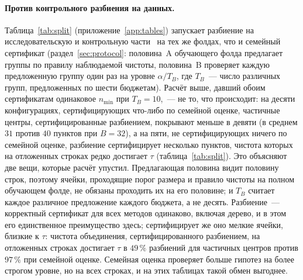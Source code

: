 \documentclass[11pt]{article}
\begin{document}
\paragraph{Против контрольного разбиения на данных.} Таблица~\ref{tab:split} (приложение~\ref{app:tables}) запускает разбиение на исследовательскую и контрольную части~\citet{webb2007} на тех же фолдах, что и семейный сертификат (раздел~\ref{sec:protocol}: половина~A обучающего фолда предлагает группы по правилу наблюдаемой чистоты, половина~B проверяет каждую предложенную группу один раз на уровне $\alpha/T_B$, где $T_B$~--- число различных групп, предложенных по шести бюджетам). Расчёт выше, давший обоим сертификатам одинаковое $n_{\min}$ при $T_B=10$,~--- не то, что происходит: на десяти конфигурациях, сертифицирующих что-либо по семейной оценке, частичные центры, сертифицированные разбиением, покрывают меньше в девяти (в среднем $31$ против $40$ пунктов при $B=32$), а на пяти, не сертифицирующих ничего по семейной оценке, разбиение сертифицирует несколько пунктов, чистота которых на отложенных строках редко достигает $\tau$ (таблица~\ref{tab:split}). Это объясняют две вещи, которые расчёт упустил. Предлагающая половина видит половину строк, поэтому ячейки, проходящие порог размера и правило чистоты на полном обучающем фолде, не обязаны проходить их на его половине; и $T_B$ считает каждое различное предложение каждого бюджета, а не десять. Разбиение~--- корректный сертификат для всех методов одинаково, включая дерево, и в этом его единственное преимущество здесь; сертифицирует же оно мелкие ячейки, близкие к $\tau$: чистота объединения, сертифицированного разбиением, на отложенных строках достигает $\tau$ в $49\,\%$ разбиений для частичных центров против $97\,\%$ при семейной оценке. Семейная оценка проверяет больше гипотез на более строгом уровне, но на всех строках, и на этих таблицах такой обмен выгоднее.
\end{document}

